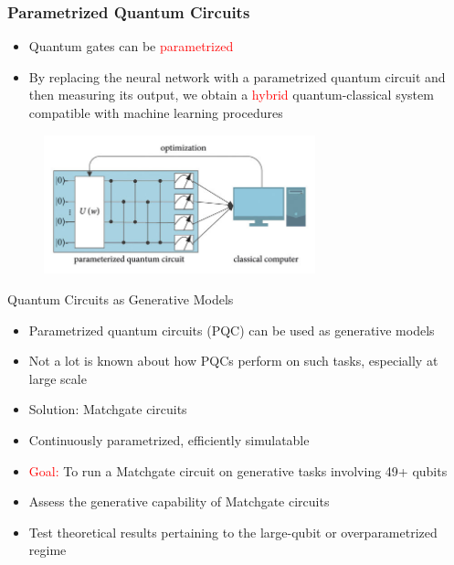 \documentclass[xcolor=dvipsnames]{beamer}
\begin{document}
\begin{frame}
  \frametitle{Parametrized Quantum Circuits}
  \begin{itemize}
    \item Quantum gates can be \textcolor{red}{parametrized}
    \item By replacing the neural network with a parametrized quantum circuit and then measuring its output, we obtain a \textcolor{red}{hybrid} quantum-classical system compatible with machine learning procedures
  \end{itemize}
  \begin{figure}
    \centering
    \includegraphics[width=0.7\textwidth]{pqc.png}
  \end{figure}
\end{frame}

\begin{frame}{Quantum Circuits as Generative Models}
  \begin{itemize}
    \item Parametrized quantum circuits (PQC) can be used as generative models
    \item Not a lot is known about how PQCs perform on such tasks, especially at large scale
    \item Solution: Matchgate circuits
    \item Continuously parametrized, efficiently simulatable
  \end{itemize}
\end{frame}

\begin{frame}
  \begin{itemize}
    \item \textcolor{red}{Goal:} To run a Matchgate circuit on generative tasks involving 49+ qubits
    \item Assess the generative capability of Matchgate circuits
    \item Test theoretical results pertaining to the large-qubit or overparametrized regime
  \end{itemize}
\end{frame}
\end{document}
